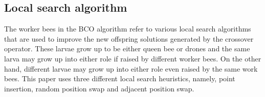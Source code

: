 \subsection{Local search algorithm}
The worker bees in the BCO algorithm refer to various local search algorithms that are used to improve the new offspring solutions generated by the crossover operator.
These larvae grow up to be either queen bee or drones and the same larva may grow up into either role if raised by different worker bees.
On the other hand, different larvae may grow up into either role even raised by the same work bees.
This paper uses three different local search heuristics, namely, point insertion, random position swap and adjacent position swap.





